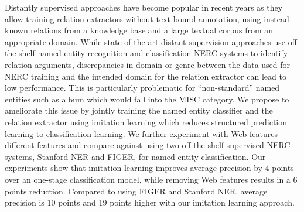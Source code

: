 Distantly supervised approaches have become popular in recent years as they allow training relation extractors without text-bound annotation, using instead known relations from a knowledge base and a large textual corpus from an appropriate domain. While state of the art distant supervision approaches use off-the-shelf named entity recognition and classification NERC systems to identify relation arguments,  discrepancies in domain or genre between the data used for NERC training and the intended domain for the relation extractor can lead to low performance. This is particularly problematic for ``non-standard'' named entities such as album which would fall into the MISC category. We propose to ameliorate this issue by jointly training the named entity classifier and the relation extractor using imitation learning which reduces structured prediction learning to classification learning. We further experiment with Web features different features and compare against using two off-the-shelf supervised NERC systems, Stanford NER and FIGER, for named entity classification. Our experiments show that imitation learning improves average precision by 4 points over an one-stage classification model, while removing Web features results in a 6 points reduction. Compared to using FIGER and Stanford NER, average precision is 10 points and 19 points higher with our imitation learning approach.

